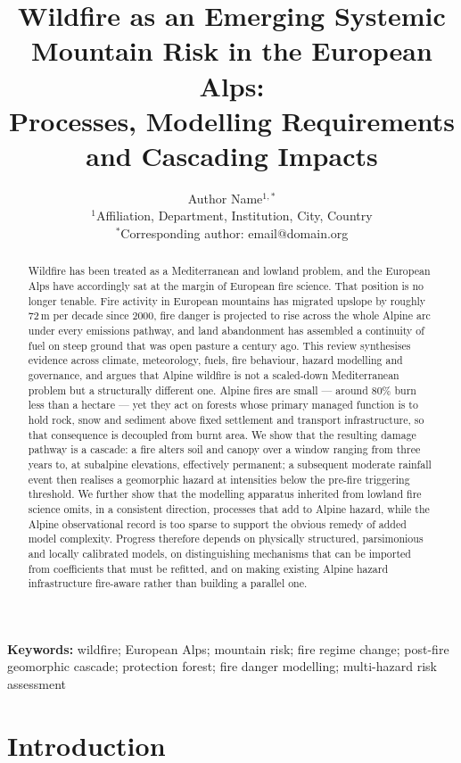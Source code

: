 \documentclass[11pt,a4paper]{article}
\title{
Wildfire as an Emerging Systemic Mountain Risk in the European Alps:\\
Processes, Modelling Requirements and Cascading Impacts
}
\author{
Author Name$^{1,*}$ \\
\small $^{1}$Affiliation, Department, Institution, City, Country \\
\small $^{*}$Corresponding author: email@domain.org
}
\date{}
\begin{document}
\maketitle


\begin{abstract}
\noindent
Wildfire has been treated as a Mediterranean and lowland problem, and the European Alps have accordingly sat at the margin of European fire science. That position is no longer tenable. Fire activity in European mountains has migrated upslope by roughly 72\,m per decade since 2000, fire danger is projected to rise across the whole Alpine arc under every emissions pathway, and land abandonment has assembled a continuity of fuel on steep ground that was open pasture a century ago. This review synthesises evidence across climate, meteorology, fuels, fire behaviour, hazard modelling and governance, and argues that Alpine wildfire is not a scaled-down Mediterranean problem but a structurally different one. Alpine fires are small --- around 80\% burn less than a hectare --- yet they act on forests whose primary managed function is to hold rock, snow and sediment above fixed settlement and transport infrastructure, so that consequence is decoupled from burnt area. We show that the resulting damage pathway is a cascade: a fire alters soil and canopy over a window ranging from three years to, at subalpine elevations, effectively permanent; a subsequent moderate rainfall event then realises a geomorphic hazard at intensities below the pre-fire triggering threshold. We further show that the modelling apparatus inherited from lowland fire science omits, in a consistent direction, processes that add to Alpine hazard, while the Alpine observational record is too sparse to support the obvious remedy of added model complexity. Progress therefore depends on physically structured, parsimonious and locally calibrated models, on distinguishing mechanisms that can be imported from coefficients that must be refitted, and on making existing Alpine hazard infrastructure fire-aware rather than building a parallel one.
\end{abstract}

\noindent\textbf{Keywords:}
wildfire; European Alps; mountain risk; fire regime change; post-fire geomorphic cascade; protection forest; fire danger modelling; multi-hazard risk assessment


\section{Introduction}
\end{document}

